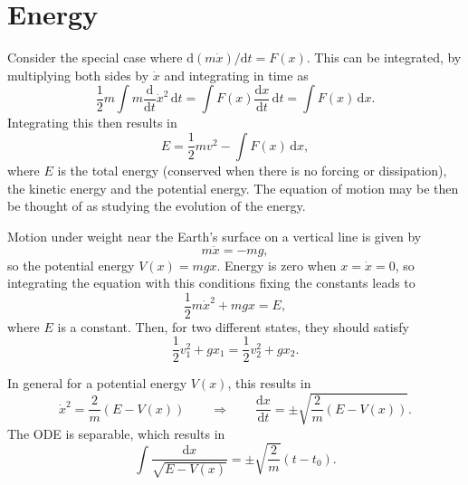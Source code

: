 \documentclass[letter-paper]{tufte-book}
\newenvironment{example}[1][Example]{\begin{trivlist}
\item[\hskip \labelsep {\bfseries #1}]}{\end{trivlist}}
\begin{document}

\section{Energy}

Consider the special case where $\mathrm{d}(m\dot{x})/\mathrm{d} t = F(x)$. This
can be integrated, by multiplying both sides by $\dot{x}$ and integrating in
time as
\begin{equation*}
  \frac{1}{2}m \int m \frac{\mathrm{d}}{\mathrm{d}t}\dot{x}^2\, \mathrm{d}t
  = \int F(x) \frac{\mathrm{d}x}{\mathrm{d}t}\, \mathrm{d}t =
  \int F(x)\, \mathrm{d}x.
\end{equation*}
Integrating this then results in
\begin{equation*}
  E = \frac{1}{2}mv^2 - \int F(x)\, \mathrm{d}x,
\end{equation*}
where $E$ is the total energy (conserved when there is no forcing or
dissipation), the kinetic energy and the potential energy. The equation of
motion may be then be thought of as studying the evolution of the energy.

\begin{example}
  Motion under weight near the Earth's surface on a vertical line is given by
  \begin{equation*}
    m\ddot{x} = -mg,
  \end{equation*}
  so the potential energy $V(x) = mgx$. Energy is zero when $x = \dot{x} = 0$,
  so integrating the equation with this conditions fixing the constants leads to
  \begin{equation*}
    \frac{1}{2}m\dot{x}^2 + mgx = E,
  \end{equation*}
  where $E$ is a constant. Then, for two different states, they should satisfy
  \begin{equation*}
    \frac{1}{2}v_1^2 + gx_1 = \frac{1}{2}v_2^2 + gx_2.
  \end{equation*}
\end{example}

In general for a potential energy $V(x)$, this results in
\begin{equation*}
  \dot{x}^2 = \frac{2}{m} (E - V(x)) \qquad \Rightarrow \qquad
  \frac{\mathrm{d}x}{\mathrm{d}t} = \pm \sqrt{\frac{2}{m}(E - V(x))}.
\end{equation*}
The ODE is separable, which results in
\begin{equation*}
  \int\frac{\mathrm{d}x}{\sqrt{E - V(x)}} = \pm \sqrt{\frac{2}{m}}(t - t_0).
\end{equation*}
\end{document}
